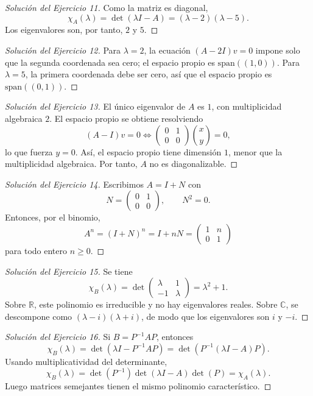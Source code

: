 \documentclass[10pt,a4paper,oneside]{article}
\theoremstyle{plain}
\theoremstyle{definition}
\theoremstyle{remark}
\newcommand{\R}{\mathbb{R}}
\newcommand{\C}{\mathbb{C}}
\newcommand{\Span}{\mathrm{span}}
\begin{document}
\begin{proof}[Solución del Ejercicio 11]
Como la matriz es diagonal,
\[\chi_A(\lambda)=\det(\lambda I-A)=(\lambda-2)(\lambda-5).
\]
Los eigenvalores son, por tanto, \(2\) y \(5\).
\end{proof}
\begin{proof}[Solución del Ejercicio 12]
Para \(\lambda=2\), la ecuación \((A-2I)v=0\) impone solo que la segunda coordenada sea cero; el espacio propio es \(\Span((1,0))\). Para \(\lambda=5\), la primera coordenada debe ser cero, así que el espacio propio es \(\Span((0,1))\).
\end{proof}
\begin{proof}[Solución del Ejercicio 13]
El único eigenvalor de \(A\) es \(1\), con multiplicidad algebraica \(2\). El espacio propio se obtiene resolviendo
\[(A-I)v=0\iff \begin{pmatrix}0&1\\0&0\end{pmatrix}\binom{x}{y}=0,
\]
lo que fuerza \(y=0\). Así, el espacio propio tiene dimensión \(1\), menor que la multiplicidad algebraica. Por tanto, \(A\) no es diagonalizable.
\end{proof}
\begin{proof}[Solución del Ejercicio 14]
Escribimos \(A=I+N\) con
\[N=\begin{pmatrix}0&1\\0&0\end{pmatrix},\qquad N^2=0.
\]
Entonces, por el binomio,
\[A^n=(I+N)^n=I+nN=\begin{pmatrix}1&n\\0&1\end{pmatrix}
\]
para todo entero \(n\ge 0\).
\end{proof}
\begin{proof}[Solución del Ejercicio 15]
Se tiene
\[
\chi_B(\lambda)=\det\begin{pmatrix}\lambda&1\\-1&\lambda\end{pmatrix}=\lambda^2+1.
\]
Sobre \(\R\), este polinomio es irreducible y no hay eigenvalores reales. Sobre \(\C\), se descompone como \((\lambda-i)(\lambda+i)\), de modo que los eigenvalores son \(i\) y \(-i\).
\end{proof}
\begin{proof}[Solución del Ejercicio 16]
Si \(B=P^{-1}AP\), entonces
\[\chi_B(\lambda)=\det(\lambda I-P^{-1}AP)=\det(P^{-1}(\lambda I-A)P).
\]
Usando multiplicatividad del determinante,
\[\chi_B(\lambda)=\det(P^{-1})\det(\lambda I-A)\det(P)=\chi_A(\lambda).
\]
Luego matrices semejantes tienen el mismo polinomio característico.
\end{proof}
\end{document}
